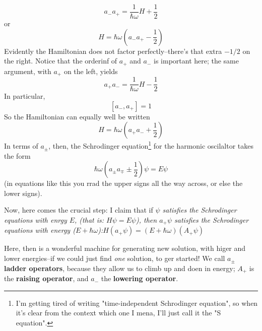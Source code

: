 \begin{equation}\label{2.52}
	a_-a_+=\frac{1}{\hbar\omega}H+\frac{1}{2}
\end{equation}
or
\begin{equation}\label{2.53}
	H=\hbar\omega\left(a_-a_+-\frac{1}{2}\right)
\end{equation}
Evidently the Hamiltonian does not factor perfectly--there's that extra $-1/2$ on the right. Notice that the orderinf of $a_+$ and $a_-$ is important here; the same argument, with $a_+$ on the left, yields
\begin{equation}\label{2.54}
	a_+a_-=\frac{1}{\hbar\omega}H-\frac{1}{2}
\end{equation}
In particular,
\begin{equation}\label{2.55}
	[a_-,a_+]=1
\end{equation}
So the Hamiltonian can equally well be written
\begin{equation}\label{2.56}
	H=\hbar\omega\left(a_+a_-+\frac{1}{2}\right)
\end{equation}
In terms of $a_{\pm}$, then, the Schrodinger equation\footnote{I'm getting tired of writing "time-independent Schrodinger equation", so when it's clear from the context which one I mena, I'll just call it the "S equation".} for the harmonic oscilaltor takes the form
\begin{equation}\label{2.57}
	\hbar\omega\left(a_{\pm}a_{\mp}\pm\frac{1}{2}\right)\psi=E\psi
\end{equation}
(in equations like this you rrad the upper signs all the way across, or else the lower signs).

Now, here comes the crucial step: I claim that if \textit{$\psi$ satisfies the Schrodinger equations with enrgy $E$, (that is: $H\psi=E\psi$), then $a_+\psi$ satisfies the Schrodinger equations with energy ($E+\hbar\omega$):$H(a_+\psi)=(E+\hbar\omega)(A_+\psi)$ }

Here, then is a wonderful machine for generating new solution, with higer and lower energies--if we could just find \textit{one} solution, to ger started! We call $a_{\pm}$ \textbf{ladder operators}, because they allow us to climb up and doen in energy; $A_+$ is the \textbf{raising operator}, and $a_-$ the \textbf{lowering operator}. 

